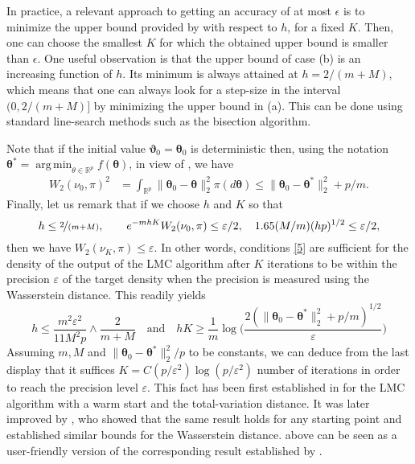 \documentclass[aoap,preprint,reqno,a4paper]{imsart} %
\DeclareMathOperator*{\argmin}{arg\,min}
\newcommand{\RR}{\mathbb{R}}
\newcommand{\btheta}{\boldsymbol{\theta}}
\newcommand{\bvartheta}{\boldsymbol{\vartheta}}
\begin{document}
In practice, a relevant approach to getting an accuracy of at most $\epsilon$ is
to  minimize the upper bound provided by  with respect to $h$, for a fixed $K$.
Then, one can choose the smallest $K$ for which the obtained upper bound is smaller than
$\epsilon$. One useful observation is that the upper bound of case (b) is an increasing
function of $h$. Its minimum is always attained at $h= 2/(m+M)$, which means that
one can always look for a step-size in the interval $(0,2/(m+M)]$ by minimizing
the upper bound in (a).  This can be done using standard line-search methods such as the
bisection algorithm.


Note that if the initial value $\bvartheta_{0}=\btheta_{0}$ is deterministic then, using the notation
$\btheta^* = \argmin_{\theta\in\RR^p} f(\btheta)$, in view of \citep[Proposition 1]{Durmus2}, we have
\begin{align}
W_2(\nu_0,\pi)^2
	& = \int_{\RR^p} \|\btheta_{0}-\btheta\|_2^2\pi(d\btheta)
	 \le \|\btheta_{0}-\btheta^*\|_2^2 + p/m.\label{4}
\end{align}
Finally, let us remark that if we choose $h$ and $K$ so that
\begin{equation}\label{5}
h\le \nicefrac{2}{(m+M)},\qquad e^{-mhK}W_2(\nu_0,\pi)\le \varepsilon/2,\quad
1.65(M/m)(hp)^{1/2}\le \varepsilon/2,
\end{equation}
then we have $W_2(\nu_K, \pi) \le \varepsilon$. In other words, conditions
\eqref{5} are sufficient for the density of the output of the LMC algorithm after $K$
iterations to be within the precision $\varepsilon$ of the target density when the precision
is measured using the Wasserstein distance. This readily yields
\begin{equation}\label{6}
h\le \frac{m^2\varepsilon^2}{11M^2p}\wedge \frac2{m+M}\quad\text{and}\quad
hK\ge \frac1m\log\Big(\frac{2(\|\btheta_{0}-\btheta^*\|_2^2+ p/m)^{1/2}}\varepsilon\Big)
\end{equation}
Assuming $m,M$ and $\|\btheta_{0}-\btheta^*\|_2^2/p$ to be constants, we can deduce
from the last display that it suffices $K = C (p/\varepsilon^{2})\log(p/\varepsilon^2)$
number of iterations in order to reach the precision level $\varepsilon$. This fact has
been first established in \citep{Dalalyan14} for the LMC algorithm with a warm start
and the total-variation distance. It was later improved by \cite{durmus2017,Durmus2},
who showed that the same result holds for any starting point and established similar
bounds for the Wasserstein distance.  above can be seen as a user-friendly version
of the corresponding result established by \cite{Durmus2}.
\end{document}

